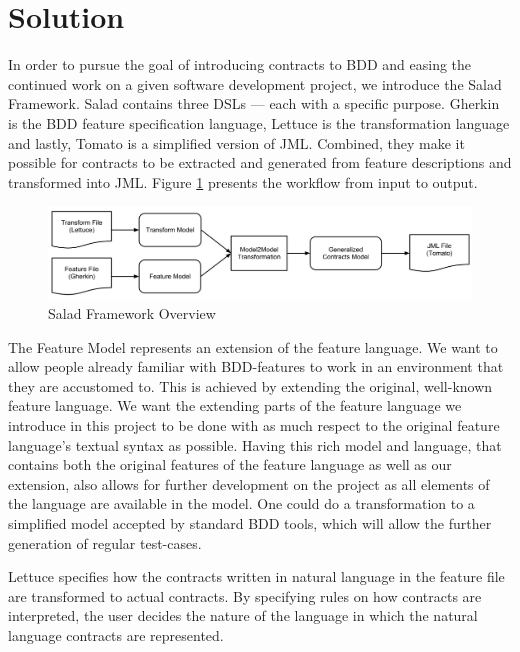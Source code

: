 \section{Solution}

In order to pursue the goal of introducing contracts to BDD and easing the continued work on a given software development project, we introduce the Salad Framework. Salad contains three DSLs --- each with a specific purpose. Gherkin is the BDD feature specification language, Lettuce is the transformation language and lastly, Tomato is a simplified version of JML.  Combined, they make it possible for contracts to be extracted and generated from feature descriptions and transformed into JML. Figure \ref{fig:saladoverview} presents the workflow from input to output.

\begin{figure}
  \begin{center}
    \includegraphics[scale=0.35]{images/framework_overview.png}
  \end{center}
  \caption{Salad Framework Overview}
  \label{fig:saladoverview}
\end{figure}

The Feature Model represents an extension of the feature language.
We want to allow people already familiar with BDD-features to work in an environment that they are accustomed to. 
This is achieved by extending the original, well-known feature language. 
We want the extending parts of the feature language we introduce in this project to be done with as much respect to the original feature language's textual syntax as possible. 
Having this rich model and language, that contains both the original features of the feature language as well as our extension, 
also allows for further development on the project as all elements of the language are available in the model. 
One could do a transformation to a simplified model accepted by standard BDD tools, which will allow the further generation of regular test-cases.

Lettuce specifies how the contracts written in natural language in the feature file are transformed to actual contracts.
By specifying rules on how contracts are interpreted, the user decides the nature of the language in which the natural language contracts are represented. 

